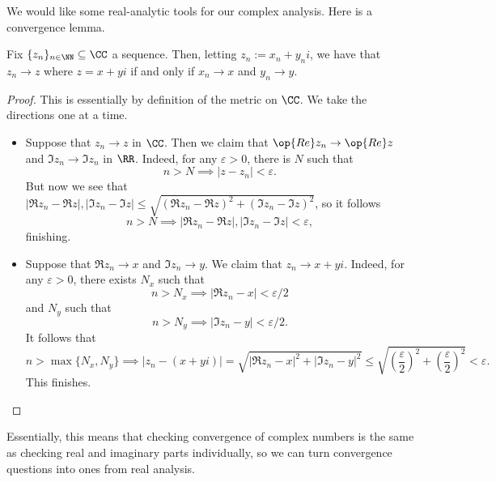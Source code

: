 We would like some real-analytic tools for our complex analysis. Here is a convergence lemma.
\begin{lemma}
	Fix $\{z_n\}_{n\in\NN}\subseteq\CC$ a sequence. Then, letting $z_n:=x_n+y_ni$, we have that $z_n\to z$ where $z=x+yi$ if and only if $x_n\to x$ and $y_n\to y$.
\end{lemma}
\begin{proof}
	This is essentially by definition of the metric on $\CC$. We take the directions one at a time.
	\begin{itemize}
		\item Suppose that $z_n\to z$ in $\CC$. Then we claim that $\op{Re}z_n\to\op{Re}z$ and $\Im z_n\to\Im z_n$ in $\RR$. Indeed, for any $\varepsilon>0$, there is $N$ such that
		\[n>N\implies|z-z_n|<\varepsilon.\]
		But now we see that $|\Re z_n-\Re z|,|\Im z_n-\Im z|\le\sqrt{(\Re z_n-\Re z)^2+(\Im z_n-\Im z)^2}$, so it follows
		\[n>N\implies|\Re z_n-\Re z|,|\Im z_n-\Im z|<\varepsilon,\]
		finishing.
		\item Suppose that $\Re z_n\to x$ and $\Im z_n\to y$. We claim that $z_n\to x+yi$. Indeed, for any $\varepsilon>0$, there exists $N_x$ such that
		\[n>N_x\implies|\Re z_n-x|<\varepsilon/2\]
		and $N_y$ such that
		\[n>N_y\implies|\Im z_n-y|<\varepsilon/2.\]
		It follows that
		\[n>\max\{N_x,N_y\}\implies|z_n-(x+yi)|=\sqrt{|\Re z_n-x|^2+|\Im z_n-y|^2}\le\sqrt{\left(\frac\varepsilon2\right)^2+\left(\frac\varepsilon2\right)^2}<\varepsilon.\]
		This finishes.
		\qedhere
	\end{itemize}
\end{proof}
Essentially, this means that checking convergence of complex numbers is the same as checking real and imaginary parts individually, so we can turn convergence questions into ones from real analysis.

